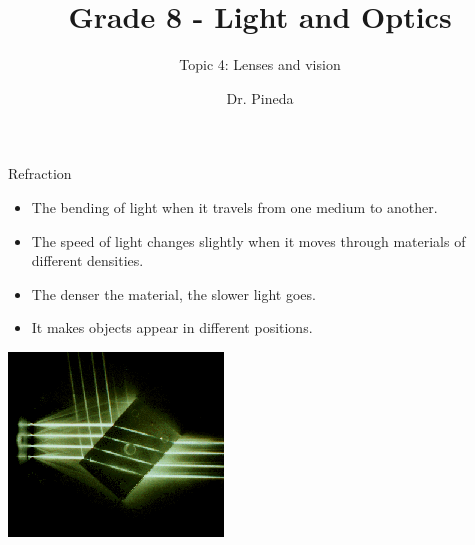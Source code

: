 \documentclass[t]{beamer}
\title[Topic 4]{Grade 8 - Light and Optics} %
\subtitle{Topic 4: Lenses and vision}
\author{Dr. Pineda}
\institute[] {\href{http://www.drpineda.ca}{www.drpineda.ca}}
\date{} %
\newcommand{\bi}{\begin{itemize}}
\newcommand{\ei}{\end{itemize}}
\begin{document}
{
\frame{\titlepage}
}


\begin{frame}{Refraction}
\bi
\item The bending of light when it travels from one medium to another. 
\item The speed of light changes slightly when it moves through materials of different densities.  
\item The denser the material, the slower light goes. 
\item It makes objects appear in different positions. 
\ei
\end{frame}

\begin{frame}
\includegraphics[width=1\linewidth]{images/refraction.png}
\end{frame}
\end{document}
